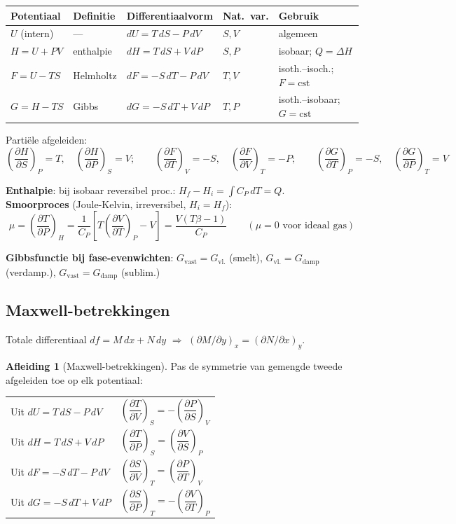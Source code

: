 \documentclass[a4paper,twoside,10pt]{article}
\theoremstyle{definition}
\newtheorem{derivation}{Afleiding}[section]
\newcommand{\pd}[3][]{\left(\dfrac{\partial #2}{\partial #3}\right)_{\!#1}}
\begin{document}
\begin{center}
\renewcommand{\arraystretch}{1.3}
\begin{tabular}{@{}lllll@{}}
\toprule
Potentiaal       & Definitie & Differentiaalvorm     & Nat.\ var. & Gebruik \\
\midrule
$U$ (intern)     & ---       & $dU = T\,dS - P\,dV$  & $S,V$      & algemeen \\
$H = U+PV$       & enthalpie & $dH = T\,dS + V\,dP$  & $S,P$      & isobaar; $Q=\Delta H$ \\
$F = U-TS$       & Helmholtz & $dF = -S\,dT - P\,dV$ & $T,V$      & isoth.--isoch.; $F=\mathrm{cst}$ \\
$G = H-TS$       & Gibbs     & $dG = -S\,dT + V\,dP$ & $T,P$      & isoth.--isobaar; $G=\mathrm{cst}$ \\
\bottomrule
\end{tabular}
\end{center}

Partiële afgeleiden:
\[
  \pd[P]{H}{S}=T,\quad\pd[S]{H}{P}=V;\qquad
  \pd[V]{F}{T}=-S,\quad\pd[T]{F}{V}=-P;\qquad
  \pd[P]{G}{T}=-S,\quad\pd[T]{G}{P}=V
\]

\textbf{Enthalpie}: bij isobaar reversibel proc.: $H_f - H_i = \int C_P\,dT = Q$.\\
\textbf{Smoorproces} (Joule-Kelvin, irreversibel, $H_i = H_f$):
\[
  \mu = \pd[H]{T}{P} = \frac{1}{C_P}\!\left[T\pd[P]{V}{T} - V\right] = \frac{V(T\beta-1)}{C_P}
  \qquad (\mu=0 \text{ voor ideaal gas})
\]

\textbf{Gibbsfunctie bij fase-evenwichten}:
$G_{\text{vast}} = G_{\text{vl.}}$ (smelt),\;
$G_{\text{vl.}} = G_{\text{damp}}$ (verdamp.),\;
$G_{\text{vast}} = G_{\text{damp}}$ (sublim.)

\subsection{Maxwell-betrekkingen}

Totale differentiaal $df = M\,dx + N\,dy$ $\Rightarrow$ $(\partial M/\partial y)_x = (\partial N/\partial x)_y$.

\begin{derivation}[Maxwell-betrekkingen]
Pas de symmetrie van gemengde tweede afgeleiden toe op elk potentiaal:
\begin{center}
\renewcommand{\arraystretch}{1.4}
\begin{tabular}{@{}ll@{}}
\toprule
Uit $dU = T\,dS - P\,dV$  & $\pd[S]{T}{V} = -\pd[V]{P}{S}$ \\
Uit $dH = T\,dS + V\,dP$  & $\pd[S]{T}{P} = \pd[P]{V}{S}$ \\
Uit $dF = -S\,dT - P\,dV$ & $\pd[T]{S}{V} = \pd[V]{P}{T}$ \\
Uit $dG = -S\,dT + V\,dP$ & $\pd[T]{S}{P} = -\pd[P]{V}{T}$ \\
\bottomrule
\end{tabular}
\end{center}
\end{derivation}
\end{document}
